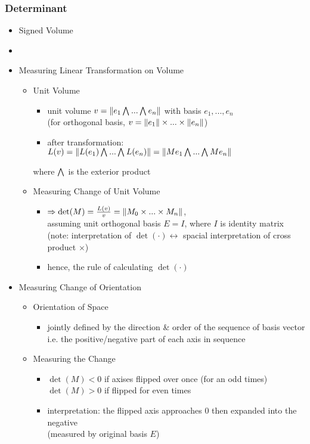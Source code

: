 \subsubsection{Determinant}
\begin{itemize}
\item Signed Volume
\item 
\item Measuring Linear Transformation on Volume
	\begin{itemize}
	\item Unit Volume
		\begin{itemize}
		\item unit volume $v=\norm{e_1 \extp ...\extp e_n}$ with basis $e_1,...,e_n$ \\
		(for orthogonal basis, $v=\lVert e_1\rVert\times...\times\lVert e_n\rVert$)
		\item after transformation: $L(v) = \norm{L(e_1)\extp...\extp L(e_n)} = \norm{Me_1\extp...\extp Me_n}$
		\end{itemize}
		where $\extp$ is the exterior product
	\item Measuring Change of Unit Volume
		\begin{itemize}
		\item $\Rightarrow \det(M) = \frac {L(v)}{v} = \lVert M_0\times...\times M_n\rVert$, \\
		assuming unit orthogonal basis $E=I$, where $I$ is identity matrix \\
		(note: interpretation of $\det(\cdot) \leftrightarrow$ spacial interpretation of cross product $\times$)
		\item hence, the rule of calculating $\det(\cdot)$ \\
		\end{itemize}
	\end{itemize}
	
\item Measuring Change of Orientation
	\begin{itemize}
	\item Orientation of Space
		\begin{itemize}
		\item jointly defined by the direction \& order of the sequence of basis vector \\
		i.e. the positive/negative part of each axis in sequence
		\end{itemize}
	\item Measuring the Change
		\begin{itemize}
		\item $\det(M) < 0$ if axises flipped over once (for an odd times) \\
		$\det(M) > 0$ if flipped for even times
		\item interpretation: the flipped axis approaches $0$ then expanded into the negative \\
		(measured by original basis $E$)
		\end{itemize}
	\end{itemize}
	

\end{itemize}
